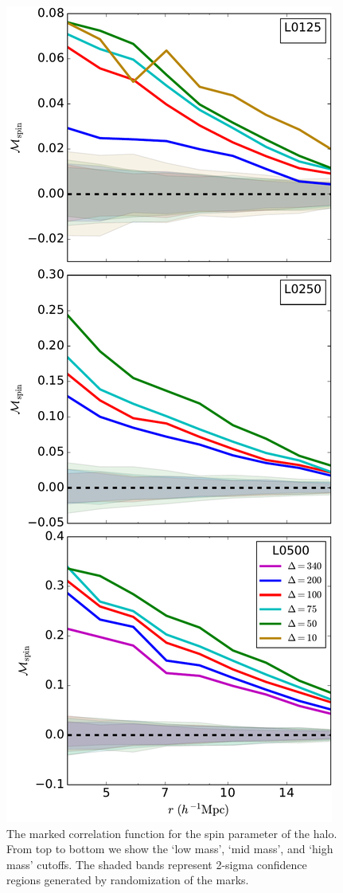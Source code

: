 \documentclass[usenatbib]{mnras}
\begin{document}
\begin{figure}
	\centering
	\includegraphics[width=.4\textwidth]{all_mcf_spin.pdf}
	\caption{The marked correlation function for the spin parameter of the halo. From top to bottom we show the `low mass', `mid mass', and `high mass' cutoffs. The shaded bands represent 2-sigma confidence regions generated by randomization of the marks.
	}
	\label{fig:cc_mcf_spin}
\end{figure}
\end{document}
